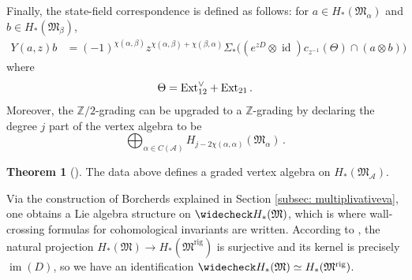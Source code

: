 \documentclass[12pt]{amsart}
\theoremstyle{definition}
\newtheorem{theorem}[definition]{Theorem}
\newcommand{\BZ}{{\mathbb{Z}}}
\newcommand{\CA}{{\mathcal A}}
\newcommand{\1}{\mathbf 1}
\newcommand{\FM}{{\mathfrak{M}}}
\DeclareMathOperator{\id}{id}
\DeclareMathOperator{\im}{im}
\newcommand{\Ext}{\mathcal{E}\text{xt}}
\newcommand{\rig}{\mathrm{rig}}
\renewcommand{\Ext}{\textup{Ext}}
\begin{document}
Finally, the state-field correspondence is defined as follows: for $a \in H_\ast(\FM_{\alpha})$ and $b \in H_\ast(\FM_{\beta})$,
\begin{align} 
Y(a, z)b &= (-1)^{\chi(\alpha, \beta)}z^{\chi(\alpha, \beta)+\chi(\beta, \alpha)}\Sigma_\ast\big((e^{zD}\otimes \id)c_{z^{-1}}(\Theta)\cap(a\otimes b)\big)
\end{align}
where 
\[\Theta=\Ext_{12}^\vee+\Ext_{21}\,.\]
Moreover, the $\BZ/2$-grading can be upgraded to a $\BZ$-grading by declaring the degree $j$ part of the vertex algebra to be
\[\bigoplus_{\alpha\in C(\CA)}H_{j-2\chi(\alpha, \alpha)}(\FM_\alpha)\,.\]

\begin{theorem}[{\cite{Jo17}}]\label{thm: joyceVA}
The data above defines a graded vertex algebra on $H_\ast(\FM_{\CA})$.
\end{theorem}

Via the construction of Borcherds explained in Section \ref{subsec: multiplivativeva}, one obtains a Lie algebra structure on $\widecheck H_\ast(\FM)$, which is where wall-crossing formulas for cohomological invariants are written. According to \cite[Proposition 3.24]{Jo17}, the natural projection $H_\ast(\FM) \to H_\ast(\FM^{\rig})$ is surjective and its kernel is precisely $\im(D)$, so we have an identification $\widecheck H_\ast(\FM)\simeq H_\ast(\FM^\rig)$.
\end{document}
